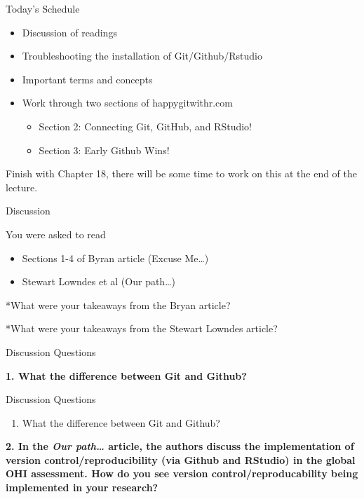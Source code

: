 \documentclass[
  ignorenonframetext,
]{beamer}
\providecommand{\tightlist}{%
  \setlength{\itemsep}{0pt}\setlength{\parskip}{0pt}}
\begin{document}
\begin{frame}{Today's Schedule}
\protect\hypertarget{todays-schedule}{}

\begin{itemize}
\tightlist
\item
  Discussion of readings
\item
  Troubleshooting the installation of Git/Github/Rstudio
\item
  Important terms and concepts
\item
  Work through two sections of happygitwithr.com

  \begin{itemize}
  \tightlist
  \item
    Section 2: Connecting Git, GitHub, and RStudio!
  \item
    Section 3: Early Github Wins!
  \end{itemize}
\end{itemize}

Finish with Chapter 18, there will be some time to work on this at the
end of the lecture.

\end{frame}

\begin{frame}{Discussion}
\protect\hypertarget{discussion}{}

You were asked to read

\begin{itemize}
\tightlist
\item
  Sections 1-4 of Byran article (Excuse Me\ldots{})
\item
  Stewart Lowndes et al (Our path\ldots{})
\end{itemize}

*What were your takeaways from the Bryan article?

*What were your takeaways from the Stewart Lowndes article?

\end{frame}

\begin{frame}{Discussion Questions}
\protect\hypertarget{discussion-questions}{}

\textbf{1. What the difference between Git and Github?}

\end{frame}

\begin{frame}{Discussion Questions}
\protect\hypertarget{discussion-questions-1}{}

\begin{enumerate}
\tightlist
\item
  What the difference between Git and Github?
\end{enumerate}

\textbf{2. In the \emph{Our path\ldots{}} article, the authors discuss
the implementation of version control/reproducibility (via Github and
RStudio) in the global OHI assessment. How do you see version
control/reproducability being implemented in your research?}

\end{frame}
\end{document}
